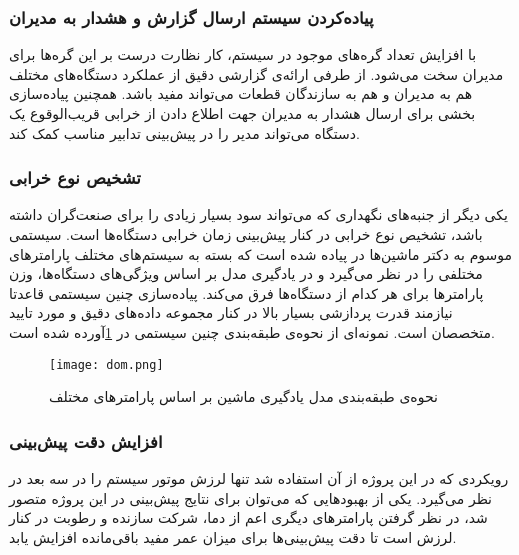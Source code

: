 \subsubsection{پیاده‌کردن سیستم ارسال گزارش و هشدار به مدیران}
با افزایش تعداد گره‌های موجود در سیستم، کار نظارت درست بر این گره‌ها برای مدیران سخت می‌شود. از طرفی ارائه‌ی گزارشی دقیق از عملکرد دستگاه‌های مختلف هم به مدیران و هم به سازندگان قطعات می‌تواند مفید باشد. همچنین پیاده‌سازی بخشی برای ارسال هشدار به مدیران جهت اطلاع دادن از خرابی قریب‌الوقوع یک دستگاه می‌تواند مدیر را در پیش‌بینی تدابیر مناسب کمک کند.

\subsubsection{تشخیص نوع خرابی}
یکی دیگر از جنبه‌های نگهداری که می‌تواند سود بسیار زیادی را برای صنعت‌گران داشته باشد، تشخیص نوع خرابی در کنار پیش‌بینی زمان خرابی دستگاه‌ها است. سیستمی موسوم به دکتر ماشین‌ها در \cite{patel2020doctor} پیاده شده است که بسته به سیستم‌های مختلف پارامتر‌های مختلفی را در نظر می‌گیرد و در یادگیری مدل بر اساس ویژگی‌های دستگاه‌ها، وزن پارامتر‌ها برای هر کدام از دستگاه‌ها فرق می‌کند. پیاده‌سازی چنین سیستمی قاعدتا نیازمند قدرت پردازشی بسیار بالا در کنار مجموعه داده‌های دقیق و مورد تایید متخصصان است. نمونه‌ای از نحوه‌ی طبقه‌بندی چنین سیستمی در \cref{fig:dom}\cite{patel2020doctor}آورده شده است.

\begin{figure}[!h]
\centerline{\texttt{[image: dom.png]}}
\caption{نحوه‌ی طبقه‌بندی مدل یادگیری ماشین بر اساس پارامتر‌های مختلف\cite{patel2020doctor}}
\label{fig:dom}
\end{figure}


\subsubsection{افزایش دقت پیش‌بینی}
رویکردی که در این پروژه از آن استفاده شد تنها لرزش موتور سیستم را در سه بعد در نظر می‌گیرد. یکی از بهبودهایی که می‌توان برای نتایج پیش‌بینی در این پروژه متصور شد، در نظر گرفتن پارامترهای دیگری اعم از دما، شرکت سازنده و رطوبت در کنار لرزش است تا دقت پیش‌بینی‌ها برای میزان عمر مفید باقی‌مانده افزایش یابد. 
